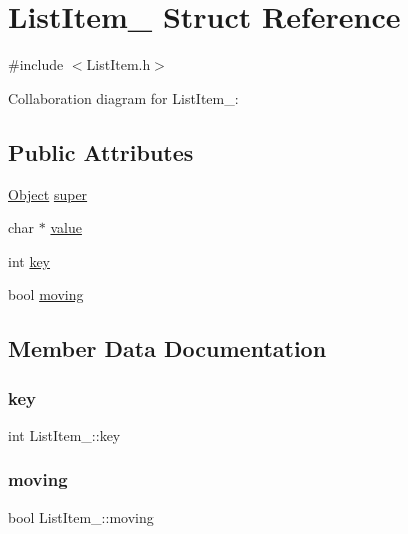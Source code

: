 \hypertarget{structListItem__}{}\section{List\+Item\+\_\+ Struct Reference}
\label{structListItem__}


{\ttfamily \#include $<$List\+Item.\+h$>$}



Collaboration diagram for List\+Item\+\_\+\+:
\subsection*{Public Attributes}
\begin{DoxyCompactItemize}
\item 
\hyperlink{Object_8h_a32b67ad7134cd31b5ec5ed9c6a2d3978}{Object} \hyperlink{structListItem___a95c71df8d8667df952c8be0e96539283}{super}
\item 
char $\ast$ \hyperlink{structListItem___a0dbf2fe4afa3a35a0b35eb4cbb471b20}{value}
\item 
int \hyperlink{structListItem___addbaeb1f42c806050953dd9f5907fe94}{key}
\item 
bool \hyperlink{structListItem___a18f13510f872a59501b908bda05e72e3}{moving}
\end{DoxyCompactItemize}


\subsection{Member Data Documentation}
\mbox{\label{structListItem___addbaeb1f42c806050953dd9f5907fe94}} 
\subsubsection{\texorpdfstring{key}{key}}
{\footnotesize\ttfamily int List\+Item\+\_\+\+::key}

\mbox{\label{structListItem___a18f13510f872a59501b908bda05e72e3}} 
\subsubsection{\texorpdfstring{moving}{moving}}
{\footnotesize\ttfamily bool List\+Item\+\_\+\+::moving}

